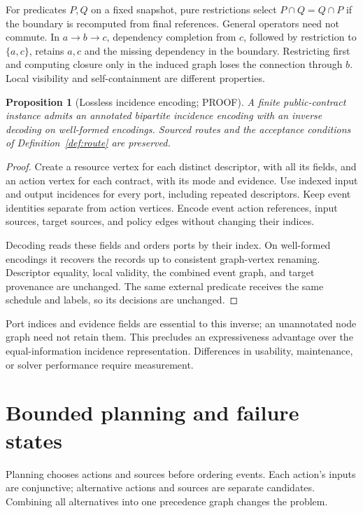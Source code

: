 \documentclass[11pt,a4paper]{article}
\newtheorem{proposition}[definition]{Proposition}
\theoremstyle{remark}
\newcommand{\status}[1]{\textsf{\small #1}}
\begin{document}
For predicates \(P,Q\) on a fixed snapshot, pure restrictions select
\(P\cap Q=Q\cap P\) if the boundary is recomputed from final references.
General operators need not commute. In \(a\to b\to c\), dependency completion
from \(c\), followed by restriction to \(\{a,c\}\), retains \(a,c\) and the
missing dependency in the boundary. Restricting first and computing closure
only in the induced graph loses the connection through \(b\).
Local visibility and self-containment are different properties.

\begin{proposition}[Lossless incidence encoding; \status{PROOF}]
\label{prop:encoding}
A finite public-contract instance admits an annotated bipartite incidence
encoding with an inverse decoding on well-formed encodings. Sourced routes
and the acceptance conditions of Definition~\ref{def:route} are preserved.
\end{proposition}
\begin{proof}
Create a resource vertex for each distinct descriptor, with all its fields,
and an action vertex for each contract, with its mode and evidence.
Use indexed input and output incidences for every port, including repeated
descriptors. Keep event identities separate from action vertices.
Encode event action references, input sources, target sources, and policy
edges without changing their indices.

Decoding reads these fields and orders ports by their index. On well-formed
encodings it recovers the records up to consistent graph-vertex renaming.
Descriptor equality, local validity, the combined event graph, and target
provenance are unchanged. The same external predicate receives the same
schedule and labels, so its decisions are unchanged.
\end{proof}
Port indices and evidence fields are essential to this inverse; an
unannotated node graph need not retain them. This precludes an expressiveness
advantage over the equal-information incidence representation.
Differences in usability, maintenance, or solver performance require measurement.

\section{Bounded planning and failure states}\label{sec:planning}
Planning chooses actions and sources before ordering events. Each action's
inputs are conjunctive; alternative actions and sources are separate candidates.
Combining all alternatives into one precedence graph changes the problem.
\end{document}
